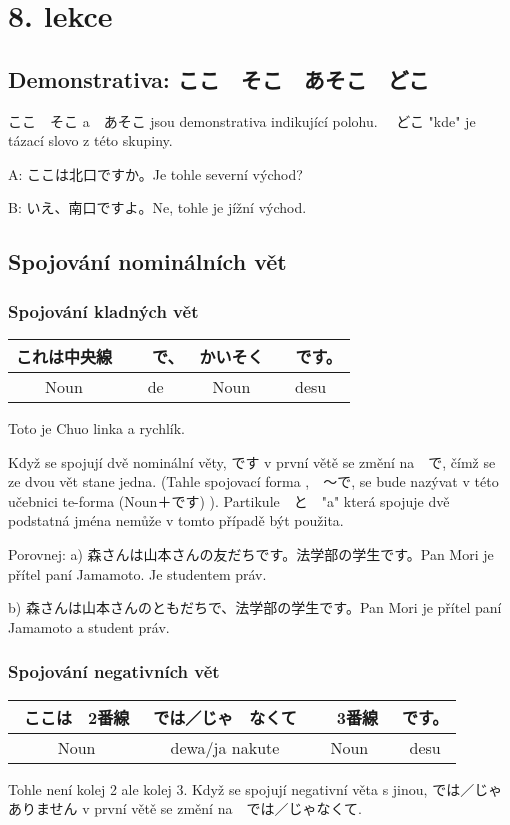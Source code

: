 \section{8. lekce}
\label{sec:lekce_8}

\subsection{Demonstrativa: ここ　そこ　あそこ　どこ}

ここ　そこ a　あそこ jsou demonstrativa indikující polohu. 　どこ "kde" je tázací slovo z této skupiny.　

A: ここは北口ですか。Je tohle severní východ?

B: いえ、南口ですよ。Ne, tohle je jížní východ.

\subsection{Spojování nominálních vět}
\subsubsection{Spojování kladných vět}
\begin{center}
\begin{tabular}{|c|c|c|c|}
\hline
これは中央線&　で、　&かいそく&　です。\\
\hline
Noun& de& Noun& desu\\
\hline
\end{tabular}
\end{center}
Toto je Chuo linka a rychlík.

Když se spojují dvě nominální věty, です v první větě se změní na　で, čímž se ze dvou vět stane jedna. (Tahle spojovací forma ,　〜で, se bude nazývat v této učebnici te-forma (Noun＋です) ). Partikule　と　"a" která spojuje dvě podstatná jména nemůže v tomto případě být použita.

Porovnej:
a) 森さんは山本さんの友だちです。法学部の学生です。Pan Mori je přítel paní Jamamoto. Je studentem práv.

b) 森さんは山本さんのともだちで、法学部の学生です。Pan Mori je přítel paní Jamamoto a student práv.

\subsubsection{Spojování negativních vět}
\begin{center}
\begin{tabular}{|c|c|c|c|}
\hline
ここは　2番線　&では／じゃ　なくて&　3番線　&です。\\
\hline
Noun&dewa/ja nakute & Noun & desu\\
\hline
\end{tabular}
\end{center}
Tohle není kolej 2 ale kolej 3.
Když se spojují negativní věta s jinou, では／じゃありません v první větě se změní na　では／じゃなくて.

